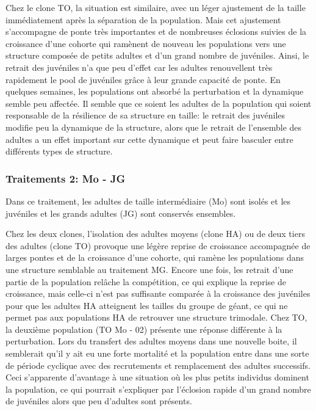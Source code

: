 Chez le clone TO, la situation est similaire, avec un léger ajustement de la
taille immédiatement après la séparation de la population. Mais cet ajustement
s'accompagne de ponte très importantes et de nombreuses éclosions suivies de
la croissance d'une cohorte qui ramènent de nouveau les populations vers une
structure composée de petits adultes et d'un grand nombre de juvéniles.
Ainsi, le retrait des juvéniles n'a que peu d'effet car les adultes renouvellent très rapidement le
pool de juvéniles grâce à leur grande capacité de ponte. En quelques semaines,
les populations ont absorbé la perturbation et la dynamique semble peu affectée.
Il semble que ce soient les adultes de la population qui soient
responsable de la résilience de sa structure en taille: le retrait des juvéniles
modifie peu la dynamique de la structure, alors que le retrait de l'ensemble des
adultes a un effet important sur cette dynamique et peut faire basculer entre
différents types de structure. 

\subsubsection{Traitements 2: Mo - JG}

Dans ce traitement, les adultes de taille intermédiaire (Mo) sont isolés et les
juvéniles et les grands adultes (JG) sont conservés ensembles.

Chez les deux clones, l'isolation des adultes moyens (clone HA) ou de deux tiers
des adultes (clone TO) provoque une légère reprise de croissance accompagnée de
larges pontes et de la croissance d'une cohorte, qui ramène les populations dans
une structure semblable au traitement MG. Encore une fois, les retrait d'une
partie de la population relâche la compétition, ce qui explique la reprise de croissance,
mais celle-ci n'est pas suffisante comparée à la croissance des juvéniles pour
que les adultes HA atteignent les tailles du groupe de géant, ce qui ne permet
pas aux populations HA de retrouver une structure trimodale. Chez TO, la
deuxième population (TO Mo - 02) présente une réponse différente à la
perturbation. Lors du transfert des adultes moyens dans une nouvelle boite, il
semblerait qu'il y ait eu une forte mortalité et la population entre dans une
sorte de période cyclique avec des recrutements et remplacement des adultes
successifs. Ceci s'apparente d'avantage à une situation où les plus petits
individus dominent la population, ce qui pourrait s'expliquer par l'éclosion
rapide d'un grand nombre de juvéniles alors que peu d'adultes sont présents. 

